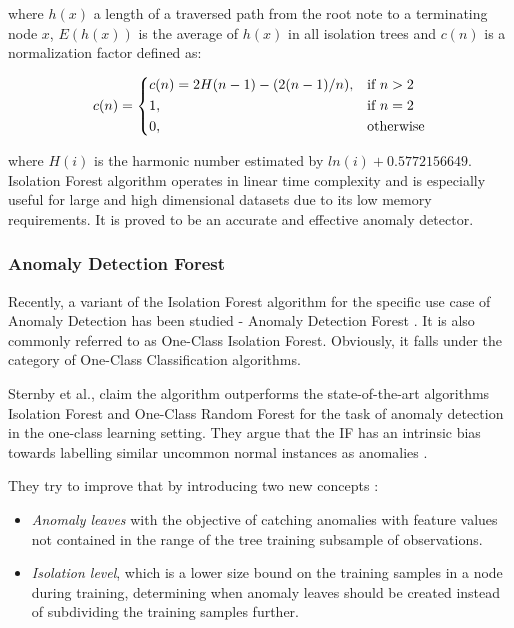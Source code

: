  where $h(x)$ a length of a traversed path from the root note to a terminating node $x$, $E(h(x))$ is the average of $h(x)$ in all isolation trees and $c(n)$ is a normalization factor defined as: 
 
 \[
 c(n) = 
  \begin{dcases}
     c(n) = 2H(n - 1) - (2(n - 1) / n), & \text{if } n > 2\\
     1, & \text{if } n = 2\\
     0, & \text{otherwise}
 \end{dcases} 
 \]
 
 where $H(i)$ is the harmonic number estimated by $ln(i) + 0.5772156649$. \\
 
 Isolation Forest algorithm operates in linear time complexity and is especially useful for large and high dimensional datasets due to its low memory requirements. It is proved to be an accurate and effective anomaly detector.
 
 \subsubsection*{Anomaly Detection Forest}
 Recently, a variant of the Isolation Forest algorithm for the specific use case of Anomaly Detection has been studied - Anomaly Detection Forest \cite{adForest}. 
 It is also commonly referred to as One-Class Isolation Forest. 
 Obviously, it falls under the category of One-Class Classification algorithms.
 
 Sternby et al., claim the algorithm outperforms the state-of-the-art algorithms Isolation Forest and One-Class Random Forest for the task of anomaly detection
in the one-class learning setting. They argue that the IF has an intrinsic bias towards labelling similar uncommon normal instances as anomalies \cite{adForest}.

They try to improve that by introducing two new concepts \cite{adForest}:
\begin{itemize}
    \item \textit{Anomaly leaves} with
        the objective of catching anomalies with feature values not contained
        in the range of the tree training subsample of observations.
    \item \textit{Isolation level}, which is a lower size bound on
            the training samples in a node during training, determining when
            anomaly leaves should be created instead of subdividing the training samples further.
\end{itemize}

